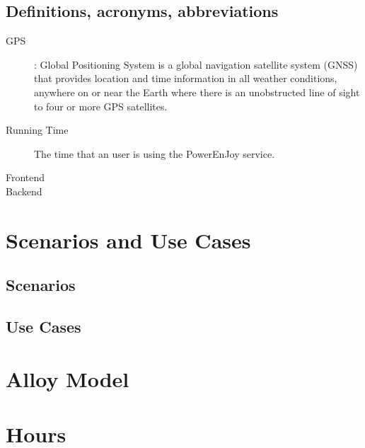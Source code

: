 \documentclass[11pt]{article} %
\newcommand{\pe}{PowerEnJoy }
\begin{document}
\subsection{Definitions,  acronyms,  abbreviations}
  	
  \begin{description}
  	\item[GPS]: Global Positioning System is a global navigation satellite system (GNSS) that provides location and time information in all weather conditions, anywhere on or near the Earth where there is an unobstructed line of sight to four or more GPS satellites.
  	\item[Running Time] The time that an user is using the \pe service.
  	\item[Frontend]
  	\item[Backend]
  \end{description}
  

\newpage
\section{Scenarios and Use Cases}

\subsection{Scenarios}

\subsection{Use Cases}


\newpage
\section{Alloy Model}

\newpage
\section{Hours}
\end{document}
